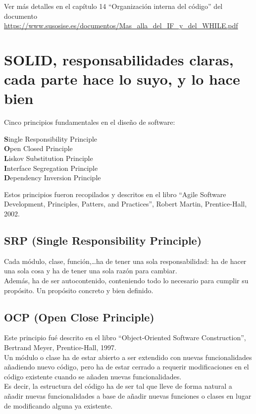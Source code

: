 \documentclass[spanish,12pt,a4paper,final,oneside]{book}
\begin{document}
Ver más detalles en el capítulo 14 ``Organización interna del código'' del documento \url{https://www.susosise.es/documentos/Mas_alla_del_IF_y_del_WHILE.pdf}


\section{SOLID, responsabilidades claras, cada parte hace lo suyo, y lo hace bien}
Cinco principios fundamentales en el diseño de software:

\textbf{S}ingle Responsibility Principle
\\ \textbf{O}pen Closed Principle
\\ \textbf{L}iskov Substitution Principle
\\ \textbf{I}nterface Segregation Principle
\\ \textbf{D}ependency Inversion Principle

Estos principios fueron recopilados y descritos en el libro ``Agile Software Development, Principles, Patters, and Practices'', Robert Martin, Prentice-Hall, 2002.

\subsection{\textbf{S}RP (Single Responsibility Principle)}
Cada módulo, clase, función,\ldots ha de tener una sola responsabilidad: ha de hacer una sola cosa y ha de tener una sola razón para cambiar.
\\Además, ha de ser autocontenido, conteniendo todo lo necesario para cumplir su propósito. Un propósito concreto y bien definido.

\subsection{\textbf{O}CP (Open Close Principle)}
Este principio fué descrito en el libro ``Object-Oriented Software Construction'', Bertrand Meyer, Prentice-Hall, 1997.
\\Un módulo o clase ha de estar abierto a ser extendido con nuevas funcionalidades añadiendo nuevo código, pero ha de estar cerrado a requerir modificaciones en el código existente cuando se añaden nuevas funcionalidades.
\\Es decir, la estructura del código ha de ser tal que lleve de forma natural a añadir nuevas funcionalidades a base de añadir nuevas funciones o clases en lugar de modificando alguna ya existente.
\end{document}
